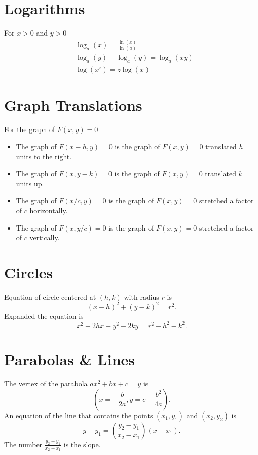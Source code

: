 \documentclass[letterpaper,landscape,9pt,fleqn]{extarticle}
\begin{document}
\begin{multicols*}{3}
\section*{Logarithms}
For $x > 0 $ and $y > 0$
   \begin{align*}
&\log_a(x) = \frac{\ln(x)}{\ln(a)}\\
&\log_a(y) + \log_a(y) = \log_a(x y) \\
&\log(x^z) = z \log(x)
     \end{align*}
\section*{Graph Translations}
\begin{minipage}[c]{0.3333333333333\textwidth}
For the graph of $F(x,y) = 0$  
\begin{itemize}
 \item The graph of $F(x-h,y)=0$ is the graph of $F(x,y) = 0$ translated $h$ units to the right. 
 
 \item The graph of $F(x,y-k)=0$ is the graph of $F(x,y) = 0$ translated $k$ units up. 
 
 \item The graph of $F(x/c,y)=0$ is the graph of $F(x,y) = 0$ stretched a factor of $c$ horizontally. 
 
 \item The graph of $F(x,y/c)=0$ is the graph of $F(x,y) = 0$ stretched a factor of $c$ vertically.
 \end{itemize}
\end{minipage}

\section*{Circles}
\begin{minipage}[c]{0.3333333333333\textwidth}
Equation of circle centered at $(h,k)$ with radius $r$ is
\[
   (x - h)^2 +  (y - k)^2  = r^2. 
\]
Expanded the equation is
\[
   x^2 - 2h x + y^2 - 2 k y = r^2 - h^2 - k^2. 
\]
\end{minipage}

\section*{Parabolas \& Lines}
\begin{minipage}[c]{0.3333333333333\textwidth}
The vertex of the parabola $a x^2 + b x + c = y$ is
\[
   \left(x = -\frac{b}{2 a}, y = c-\frac{{{b}^{2}}}{4 a} \right).
\]
An equation of the line that contains the points
\( (x_1, y_1) \) and  \((x_2, y_2) \) is
\[
  y - y_1 = \left(\frac{y_2-y_1}{x_2-x_1} \right) (x - x_1).
\]
The number \(\frac{y_2-y_1}{x_2-x_1} \) is the slope.
\end{minipage}





\end{multicols*}
\end{document}
